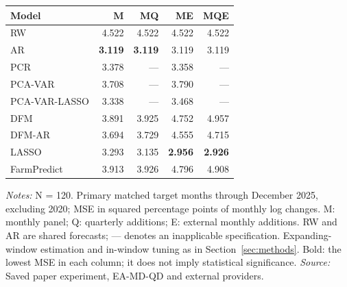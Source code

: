 \begin{threeparttable}
\begin{tabular}{lrrrr}
\toprule
Model & M & MQ & ME & MQE \\
\midrule
RW & 4.522 & 4.522 & 4.522 & 4.522 \\
AR & \textbf{3.119} & \textbf{3.119} & 3.119 & 3.119 \\
PCR & 3.378 & --- & 3.358 & --- \\
PCA-VAR & 3.708 & --- & 3.790 & --- \\
PCA-VAR-LASSO & 3.338 & --- & 3.468 & --- \\
DFM & 3.891 & 3.925 & 4.752 & 4.957 \\
DFM-AR & 3.694 & 3.729 & 4.555 & 4.715 \\
LASSO & 3.293 & 3.135 & \textbf{2.956} & \textbf{2.926} \\
FarmPredict & 3.913 & 3.926 & 4.796 & 4.908 \\
\bottomrule
\end{tabular}
\begin{tablenotes}[flushleft]\footnotesize
\item \textit{Notes:} N = 120. Primary matched target months through December 2025, excluding 2020; MSE in squared percentage points of monthly log changes. M: monthly panel; Q: quarterly additions; E: external monthly additions. RW and AR are shared forecasts; --- denotes an inapplicable specification. Expanding-window estimation and in-window tuning as in Section~\ref{sec:methods}. Bold: the lowest MSE in each column; it does not imply statistical significance. \textit{Source:} Saved paper experiment, EA-MD-QD and external providers.
\end{tablenotes}
\end{threeparttable}
